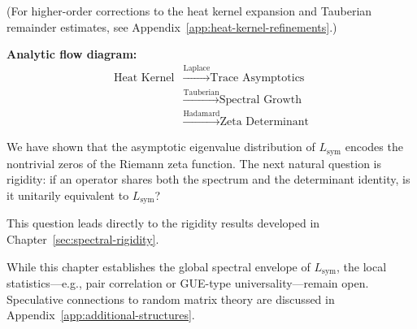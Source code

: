 \medskip
\noindent
(For higher-order corrections to the heat kernel expansion and Tauberian remainder estimates, see Appendix~\ref{app:heat-kernel-refinements}.)

\vspace{0.5em}

\noindent\textbf{Analytic flow diagram:}
\[
\begin{aligned}
\text{Heat Kernel}
&\xrightarrow{\text{Laplace}} \text{Trace Asymptotics} \\
&\xrightarrow{\text{Tauberian}} \text{Spectral Growth} \\
&\xrightarrow{\text{Hadamard}} \text{Zeta Determinant}
\end{aligned}
\]

\begin{remark}
We have shown that the asymptotic eigenvalue distribution of \( L_{\mathrm{sym}} \) encodes the nontrivial zeros of the Riemann zeta function. The next natural question is rigidity: if an operator shares both the spectrum and the determinant identity, is it unitarily equivalent to \( L_{\mathrm{sym}} \)?

This question leads directly to the rigidity results developed in Chapter~\ref{sec:spectral-rigidity}.
\end{remark}

\vspace{0.5em}

\noindent
While this chapter establishes the global spectral envelope of \( L_{\mathrm{sym}} \), the local statistics—e.g., pair correlation or GUE-type universality—remain open. Speculative connections to random matrix theory are discussed in Appendix~\ref{app:additional-structures}.
